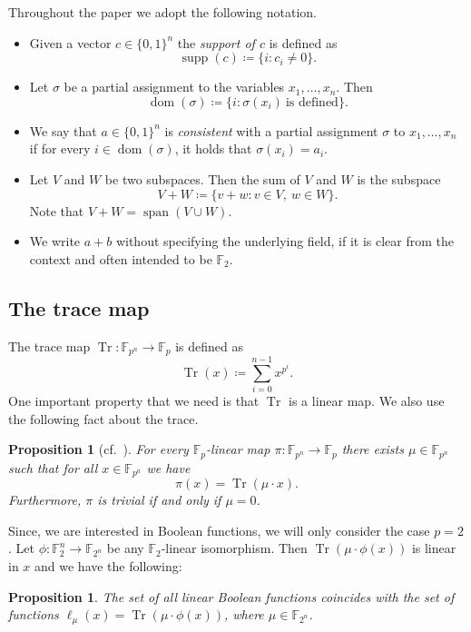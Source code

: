 \documentclass[a4paper,11pt,draft]{article}
\newtheorem{proposition}[theorem]{Proposition}
\theoremstyle{definition}
\theoremstyle{remark}
\DeclareMathOperator{\supp}{supp}
\DeclareMathOperator{\dom}{dom}
\DeclareMathOperator{\Span}{span}
\DeclareMathOperator{\Tr}{Tr}
\newcommand{\Q}{{\{0,1\}}}
\newcommand{\bbF}{\mathbb{F}}
\begin{document}
Throughout the paper we adopt the following notation.
\begin{itemize}
  \item Given a vector $c \in \Q^n$ the \emph{support of $c$} is defined as
  \[
    \supp(c) \coloneqq \{i : c_i \neq 0\}.
  \]

  \item Let $\sigma$ be a partial assignment to the variables $x_1, \ldots, x_n$. Then
  \[
    \dom(\sigma) \coloneqq \{i : \sigma(x_i)\ \text{is defined}\}.
  \]

  \item We say that $a \in \Q^n$ is \emph{consistent} with a partial assignment $\sigma$ to $x_1, \ldots, x_n$ if for every $i \in \dom(\sigma)$, it holds that $\sigma(x_i) = a_i$.
  
  \item Let $V$ and $W$ be two subspaces. Then the sum of $V$ and $W$ is the subspace
  \[
    V+W \coloneqq \{v+w : v \in V,\ w \in W\}.
  \]
  Note that $V + W = \Span(V \cup W)$.

  \item We write $a+b$ without specifying the underlying field, if it is clear from the context and often intended to be $\bbF_2$.
\end{itemize}

\subsection{The trace map}

The trace map $\Tr\colon \bbF_{p^n} \to \bbF_p$ is defined as
\[
  \Tr(x) \coloneqq \sum_{i=0}^{n-1} x^{p^i}.
\]
One important property that we need is that $\Tr$ is a linear map. We also use the following fact about the trace.
\begin{proposition}[cf.~\cite{lidl_niederreiter_1996}]\label{prop:trace_linear}
  For every $\bbF_p$-linear map $\pi\colon \bbF_{p^n} \to \bbF_p$ there exists $\mu \in \bbF_{p^n}$ such that for all $x \in \bbF_{p^n}$ we have
  \[
    \pi(x) = \Tr(\mu \cdot x).
  \]
  Furthermore, $\pi$ is trivial if and only if $\mu = 0$.
\end{proposition}

Since, we are interested in Boolean functions, we will only consider the case $p=2$.
Let $\phi\colon \bbF_2^n \to \bbF_{2^n}$ be any $\bbF_2$-linear isomorphism. Then $\Tr(\mu \cdot \phi(x))$ is linear in $x$ and we have the following:
\begin{proposition}\label{prop:trace_linear_boolean}
  The set of all linear Boolean functions coincides with the set of functions $\ell_\mu(x) = \Tr(\mu \cdot \phi(x))$, where $\mu \in \bbF_{2^n}$.
\end{proposition}
\end{document}
